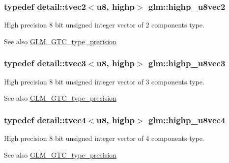 \subsubsection[{\texorpdfstring{highp\+\_\+u8vec2}{highp_u8vec2}}]{\setlength{\rightskip}{0pt plus 5cm}typedef detail\+::tvec2$<$u8, highp$>$ {\bf glm\+::highp\+\_\+u8vec2}}\hypertarget{group__gtc__type__precision_ga9aed4b3bacd37a43ec369bcf76be144a}{}\label{group__gtc__type__precision_ga9aed4b3bacd37a43ec369bcf76be144a}
High precision 8 bit unsigned integer vector of 2 components type. \begin{DoxySeeAlso}{See also}
\hyperlink{group__gtc__type__precision}{G\+L\+M\+\_\+\+G\+T\+C\+\_\+type\+\_\+precision} 
\end{DoxySeeAlso}
\subsubsection[{\texorpdfstring{highp\+\_\+u8vec3}{highp_u8vec3}}]{\setlength{\rightskip}{0pt plus 5cm}typedef detail\+::tvec3$<$u8, highp$>$ {\bf glm\+::highp\+\_\+u8vec3}}\hypertarget{group__gtc__type__precision_ga52bdf53a4f05023c13a9b817526d249f}{}\label{group__gtc__type__precision_ga52bdf53a4f05023c13a9b817526d249f}
High precision 8 bit unsigned integer vector of 3 components type. \begin{DoxySeeAlso}{See also}
\hyperlink{group__gtc__type__precision}{G\+L\+M\+\_\+\+G\+T\+C\+\_\+type\+\_\+precision} 
\end{DoxySeeAlso}
\subsubsection[{\texorpdfstring{highp\+\_\+u8vec4}{highp_u8vec4}}]{\setlength{\rightskip}{0pt plus 5cm}typedef detail\+::tvec4$<$u8, highp$>$ {\bf glm\+::highp\+\_\+u8vec4}}\hypertarget{group__gtc__type__precision_ga3a46f19674a65471988b41ffdaa834c5}{}\label{group__gtc__type__precision_ga3a46f19674a65471988b41ffdaa834c5}
High precision 8 bit unsigned integer vector of 4 components type. \begin{DoxySeeAlso}{See also}
\hyperlink{group__gtc__type__precision}{G\+L\+M\+\_\+\+G\+T\+C\+\_\+type\+\_\+precision} 
\end{DoxySeeAlso}
